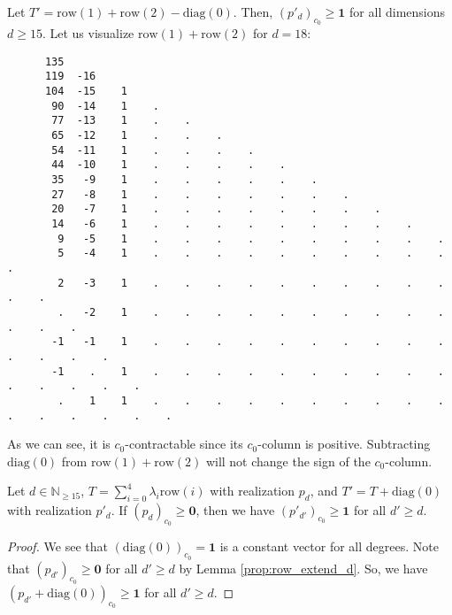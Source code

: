 \begin{example}
    Let \( T' = \mathrm{row}(1) + \mathrm{row}(2) - \mathrm{diag}(0)\).
    Then, \((p'_d)_{c_0} \geq \mathbf 1 \) for all dimensions \( d \geq 15 \). Let us visualize \( \mathrm{row}(1) + \mathrm{row}(2) \) for \( d = 18 \):
    \begingroup
    \fontsize{8pt}{10pt}\selectfont
    \begin{verbatim}
      135 
      119  -16 
      104  -15    1 
       90  -14    1    . 
       77  -13    1    .    . 
       65  -12    1    .    .    . 
       54  -11    1    .    .    .    . 
       44  -10    1    .    .    .    .    . 
       35   -9    1    .    .    .    .    .    . 
       27   -8    1    .    .    .    .    .    .    . 
       20   -7    1    .    .    .    .    .    .    .    . 
       14   -6    1    .    .    .    .    .    .    .    .    . 
        9   -5    1    .    .    .    .    .    .    .    .    .    . 
        5   -4    1    .    .    .    .    .    .    .    .    .    .    . 
        2   -3    1    .    .    .    .    .    .    .    .    .    .    .    . 
        .   -2    1    .    .    .    .    .    .    .    .    .    .    .    .    . 
       -1   -1    1    .    .    .    .    .    .    .    .    .    .    .    .    .    . 
       -1    .    1    .    .    .    .    .    .    .    .    .    .    .    .    .    .    . 
        .    1    1    .    .    .    .    .    .    .    .    .    .    .    .    .    .    .    .
    \end{verbatim}
    \endgroup
    As we can see, it is \( c_0 \)-contractable since its \( c_0 \)-column is positive. Subtracting \( \mathrm{diag}(0) \) from \( \mathrm{row}(1) + \mathrm{row}(2) \) will not change the sign of the \( c_0 \)-column.
  \end{example}

\begin{proposition}\label{prop:row_homo_zero_diag}
     Let \( d \in \mathbb{N}_{\geq 15} \), \( T = \sum_{i=0}^4 \lambda_i \mathrm{row}(i)\) with realization \( p_d \), and \( T' = T + \mathrm{diag}(0) \) with realization \( p'_d \). If \( (p_d)_{c_0} \geq \mathbf{0} \), then we have \( (p'_{d'})_{c_0} \geq \mathbf 1 \) for all \( d' \geq d \).
\end{proposition}
  
  
\begin{proof}
    We see that \( (\mathrm{diag}(0))_{c_0} = \mathbf 1 \) is a constant vector for all degrees. Note that \( (p_{d'})_{c_0} \geq \mathbf 0 \) for all \( d' \geq d \) by Lemma \ref{prop:row_extend_d}. So, we have \( (p_{d'} + \mathrm{diag}(0))_{c_0} \geq \mathbf 1 \) for all \( d' \geq d \).
\end{proof}
  
